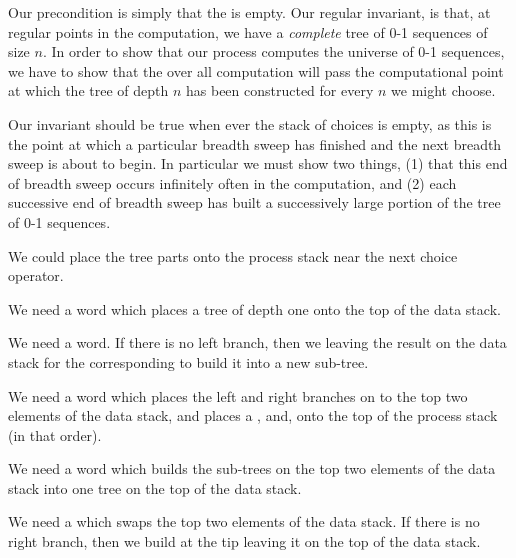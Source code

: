 Our precondition is simply that the  is empty. Our regular 
invariant, is that, at regular points in the computation, we have a 
\emph{complete} tree of 0-1 sequences of size $n$. In order to show that 
our process computes the  universe of 0-1 sequences, we 
 have to show that the over all computation will pass the 
computational point at which the tree of depth $n$ has been constructed 
for every $n$ we might choose. 

Our invariant should be true when ever the stack of choices is empty, as 
this is the point at which a particular breadth sweep has finished and the 
next breadth sweep is about to begin. In particular we must show two 
things, (1) that this end of breadth sweep occurs infinitely often in the 
computation, and (2) each successive end of breadth sweep has built a 
successively large portion of the tree of 0-1 sequences. 

We could place the tree parts onto the process stack near the next choice 
operator. 

We need a  word which places a tree of depth one onto 
the top of the data stack. 

We need a  word. If there is no left branch, then 
we  leaving the result on the data stack for the 
corresponding  to build it into a new sub-tree.

We need a  word which places the left and right 
branches on to the top two elements of the data stack, and places a 
,  and,  onto the top of the process stack (in that order). 

We need a  word which builds the sub-trees on the top 
two elements of the data stack into one tree on the top of the data stack. 

We need a  which swaps the top two elements of 
the data stack. If there is no right branch, then we build at the tip 
leaving it on the top of the data stack.

